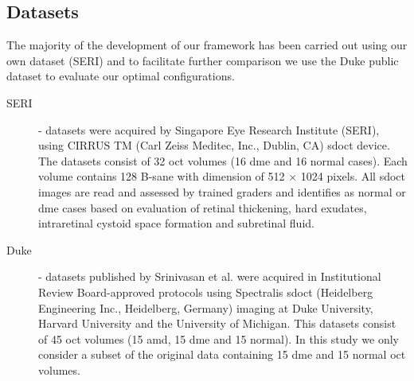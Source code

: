 \subsection{Datasets}\label{sec:exp:datasets}

The majority of the development of our framework has been carried out using our own dataset (SERI) and to facilitate further comparison we use the Duke public dataset to evaluate our optimal configurations.

\begin{description}

\item[SERI]- datasets were acquired by Singapore Eye Research Institute (SERI), using CIRRUS TM (Carl Zeiss Meditec, Inc., Dublin, CA) \ac{sdoct} device. The datasets consist of 32 \ac{oct} volumes (16 \ac{dme} and 16 normal cases). Each volume contains 128 B-sane with  dimension of 512 $\times$ 1024 pixels.  All \ac{sdoct} images are read and assessed by trained graders and identifies as normal or \ac{dme} cases based on evaluation of retinal thickening, hard exudates, intraretinal cystoid space formation and subretinal fluid.

\item[Duke] - datasets published by Srinivasan et al. \cite{Srinivasan2014} were acquired in Institutional Review Board-approved protocols using Spectralis \ac{sdoct} (Heidelberg Engineering Inc., Heidelberg, Germany) imaging at Duke University, Harvard University and the University of Michigan. This datasets consist of 45 \ac{oct} volumes (15 \ac{amd}, 15 \ac{dme} and 15 normal). In this study we only consider a subset of the original data containing 15 \ac{dme} and 15 normal \ac{oct} volumes.

\end{description}




